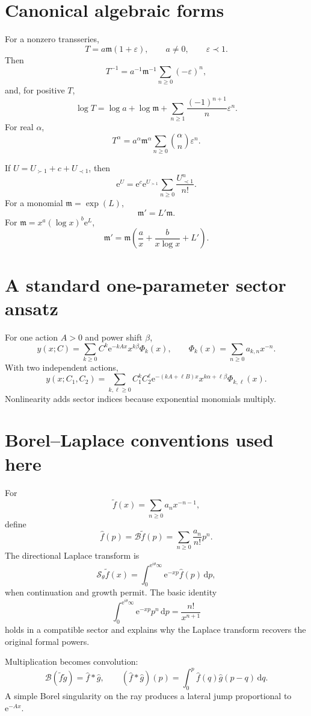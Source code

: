 \documentclass[11pt,openany]{book}
\theoremstyle{plain}
\theoremstyle{definition}
\theoremstyle{remark}
\newcommand{\m}{\mathfrak{m}}
\newcommand{\Borel}{\mathcal{B}}
\newcommand{\dd}{\,\mathrm{d}}
\newcommand{\e}{\mathrm{e}}
\begin{document}
\section{Canonical algebraic forms}

\begin{ideabox}
For a nonzero transseries,
\[
 T=a\m(1+\varepsilon),
 \qquad a\ne0,
 \qquad \varepsilon\prec1.
\]
Then
\[
 T^{-1}=a^{-1}\m^{-1}\sum_{n\ge0}(-\varepsilon)^n,
\]
and, for positive $T$,
\[
 \log T=\log a+\log\m+
 \sum_{n\ge1}\frac{(-1)^{n+1}}{n}\varepsilon^n.
\]
For real $\alpha$,
\[
 T^\alpha=a^\alpha\m^\alpha
 \sum_{n\ge0}\binom{\alpha}{n}\varepsilon^n.
\]
\end{ideabox}

If $U=U_{\succ1}+c+U_{\prec1}$, then
\[
 \e^U=\e^c\e^{U_{\succ1}}
 \sum_{n\ge0}\frac{U_{\prec1}^n}{n!}.
\]
For a monomial $\m=\exp(L)$,
\[
 \m'=L'\m.
\]
For $\m=x^a(\log x)^b\e^{L}$,
\[
 \m'=\m\left(\frac{a}{x}+\frac{b}{x\log x}+L'\right).
\]

\section{A standard one-parameter sector ansatz}

For one action $A>0$ and power shift $\beta$,
\[
 y(x;C)=\sum_{k\ge0}C^k\e^{-kAx}x^{k\beta}
 \Phi_k(x),
 \qquad
 \Phi_k(x)=\sum_{n\ge0}a_{k,n}x^{-n}.
\]
With two independent actions,
\[
 y(x;C_1,C_2)=
 \sum_{k,\ell\ge0}C_1^kC_2^\ell
 \e^{-(kA+\ell B)x}
 x^{k\alpha+\ell\beta}\Phi_{k,\ell}(x).
\]
Nonlinearity adds sector indices because exponential monomials multiply.

\section{Borel--Laplace conventions used here}

For
\[
 \widetilde f(x)=\sum_{n\ge0}a_nx^{-n-1},
\]
define
\[
 \widehat f(p)=\Borel\widetilde f(p)
 =\sum_{n\ge0}\frac{a_n}{n!}p^n.
\]
The directional Laplace transform is
\[
 \mathscr S_\theta\widetilde f(x)
 =\int_0^{\e^{i\theta}\infty}
   \e^{-xp}\widehat f(p)\dd p,
\]
when continuation and growth permit. The basic identity
\[
 \int_0^{\e^{i\theta}\infty}\e^{-xp}p^n\dd p
 =\frac{n!}{x^{n+1}}
\]
holds in a compatible sector and explains why the Laplace transform recovers the original formal powers.

Multiplication becomes convolution:
\[
 \Borel(\widetilde f\widetilde g)
 =\widehat f*\widehat g,
 \qquad
 (\widehat f*\widehat g)(p)
 =\int_0^p\widehat f(q)\widehat g(p-q)\dd q.
\]
A simple Borel singularity on the ray produces a lateral jump proportional to $\e^{-Ax}$.
\end{document}
